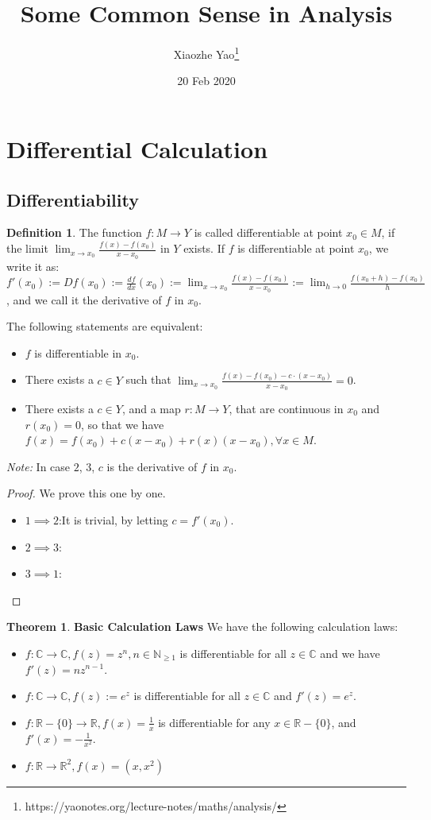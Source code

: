 \documentclass{article}
\title{Some Common Sense in Analysis}
\author{Xiaozhe Yao\footnote{https://yaonotes.org/lecture-notes/maths/analysis/}}
\date{20 Feb 2020}
\theoremstyle{definition}
\newtheorem{defi}{Definition}[section]
\newtheorem{theorem}{Theorem}[section]
\begin{document}
\maketitle
\section{Differential Calculation}
\subsection{Differentiability}
\begin{defi}
The function $f:M\to Y$ is called differentiable at point $x_0\in M$, if the limit $\lim_{x\to x_0}\frac{f(x)-f(x_0)}{x-x_0}$ in $Y$ exists. If $f$ is differentiable at point $x_0$, we write it as: $f'(x_0):=Df(x_0) := \frac{df}{dx}(x_0) := \lim_{x\to x_0}\frac{f(x)-f(x_0)}{x-x_0} := \lim_{h\to 0}\frac{f(x_0+h)-f(x_0)}{h}$, and we call it the derivative of $f$ in $x_0$.
\end{defi}
\begin{prop}
The following statements are equivalent:
\begin{itemize}
    \item $f$ is differentiable in $x_0$.
    \item There exists a $c\in Y$ such that $\lim_{x\to x_0}\frac{f(x)-f(x_0)-c\cdot (x-x_0)}{x-x_0}=0$.
    \item There exists a $c\in Y$, and a map $r: M\to Y$, that are continuous in $x_0$ and $r(x_0)=0$, so that we have $f(x)=f(x_0)+c(x-x_0)+r(x)(x-x_0), \forall x\in M$.
\end{itemize}
\end{prop}
\textit{Note:} In case $2$, $3$, $c$ is the derivative of $f$ in $x_0$.
\begin{proof} We prove this one by one.
\begin{itemize}
    \item $1\implies 2$:It is trivial, by letting $c=f'(x_0)$.
    \item $2\implies 3$:
    \item $3\implies 1$:
\end{itemize}
\end{proof}
\begin{theorem}
\textbf{Basic Calculation Laws}
We have the following calculation laws:
\begin{itemize}
    \item $f: \mathbb{C}\to\mathbb{C}, f(z)=z^{n}, n\in\mathbb{N}_{\geq1}$ is differentiable for all $z\in\mathbb{C}$ and we have $f'(z)=nz^{n-1}$.
    \item $f:\mathbb{C}\to\mathbb{C}, f(z):=e^{z}$ is differentiable for all $z\in\mathbb{C}$ and $f'(z)=e^z$.
    \item $f: \mathbb{R}-\{0\}\to\mathbb{R}, f(x)=\frac{1}{x}$ is differentiable for any $x\in\mathbb{R}-\{0\}$, and $f'(x)=-\frac{1}{x^2}$.
    \item $f: \mathbb{R}\to\mathbb{R}^{2}, f(x)=(x, x^2)$ 
\end{itemize}
\end{theorem}
\end{document}

